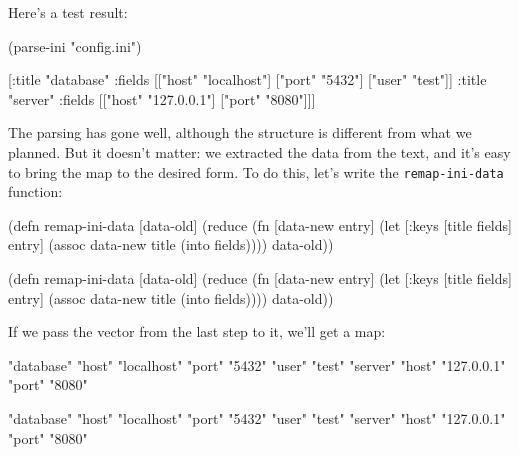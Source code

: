 \noindent
Here's a test result:

\begin{english}
  \begin{clojure}
(parse-ini "config.ini")

[{:title "database"
  :fields [["host" "localhost"]
           ["port" "5432"]
           ["user" "test"]]}
 {:title "server"
  :fields [["host" "127.0.0.1"]
           ["port" "8080"]]}]
  \end{clojure}
\end{english}

The parsing has gone well, although the structure is different from what we planned. But it doesn't matter: we extracted the data from the text, and it's easy to bring the map to the desired form. To do this, let's write the \verb|remap-ini-data| function:

\ifx\DEVICETYPE\MOBILE

\begin{english}
  \begin{clojure}
(defn remap-ini-data [data-old]
  (reduce
   (fn [data-new entry]
     (let [{:keys [title fields]} entry]
       (assoc data-new
         title (into {} fields))))
   {}
   data-old))
  \end{clojure}
\end{english}

\else

\begin{english}
  \begin{clojure}
(defn remap-ini-data [data-old]
  (reduce
   (fn [data-new entry]
     (let [{:keys [title fields]} entry]
       (assoc data-new title (into {} fields))))
   {}
   data-old))
  \end{clojure}
\end{english}

\fi

\noindent
If we pass the vector from the last step to it, we'll get a map:

\ifx\DEVICETYPE\MOBILE

\begin{english}
  \begin{clojure}
{"database" {"host" "localhost"
             "port" "5432"
             "user" "test"}
 "server" {"host" "127.0.0.1"
           "port" "8080"}}
  \end{clojure}
\end{english}

\else

\begin{english}
  \begin{clojure}
{"database" {"host" "localhost" "port" "5432" "user" "test"}
 "server" {"host" "127.0.0.1" "port" "8080"}}
  \end{clojure}
\end{english}

